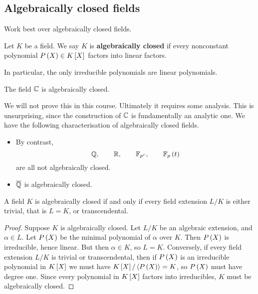 \subsection{Algebraically closed fields}

Work best over algebraically closed fields.

\begin{definition}
Let $ K $ be a field. We say $ K $ is \textbf{algebraically closed} if every nonconstant polynomial $ P\rb{X} \in K\sb{X} $ factors into linear factors.
\end{definition}

In particular, the only irreducible polynomials are linear polynomials.

\begin{theorem}
The field $ \C $ is algebraically closed.
\end{theorem}

We will not prove this in this course. Ultimately it requires some analysis. This is unsurprising, since the construction of $ \C $ is fundamentally an analytic one. We have the following characterisation of algebraically closed fields.

\begin{example*}
\hfill
\begin{itemize}
\item By contrast,
$$ \Q, \qquad \R, \qquad \F_{p^r}, \qquad \F_p\rb{t} $$
are all not algebraically closed.
\item $ \overline{\Q} $ is algebraically closed.
\end{itemize}
\end{example*}

\begin{lemma}
A field $ K $ is algebraically closed if and only if every field extension $ L / K $ is either trivial, that is $ L = K $, or transcendental.
\end{lemma}

\begin{proof}
Suppose $ K $ is algebraically closed. Let $ L / K $ be an algebraic extension, and $ \alpha \in L $. Let $ P\rb{X} $ be the minimal polynomial of $ \alpha $ over $ K $. Then $ P\rb{X} $ is irreducible, hence linear. But then $ \alpha \in K $, so $ L = K $. Conversely, if every field extension $ L / K $ is trivial or transcendental, then if $ P\rb{X} $ is an irreducible polynomial in $ K\sb{X} $ we must have $ K\sb{X} / \ab{P\rb{X}} = K $, so $ P\rb{X} $ must have degree one. Since every polynomial in $ K\sb{X} $ factors into irreducibles, $ K $ must be algebraically closed.
\end{proof}

